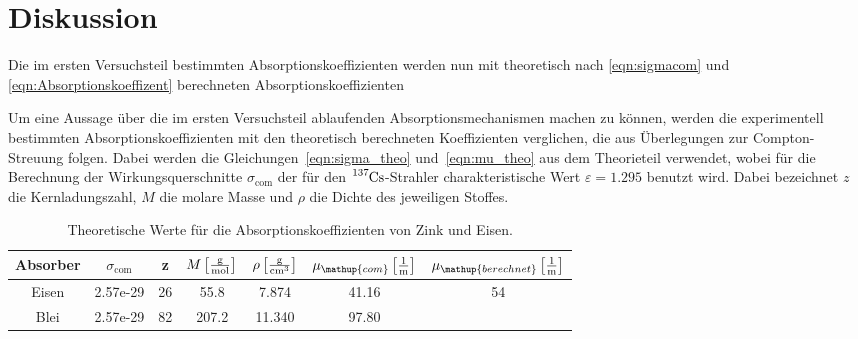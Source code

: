\section{Diskussion}
\label{sec:Diskussion}

Die im ersten Versuchsteil bestimmten Absorptionskoeffizienten werden nun mit theoretisch nach \autoref{eqn:sigmacom} und
\autoref{eqn:Absorptionskoeffizent} berechneten Absorptionskoeffizienten 


Um eine Aussage über die im ersten Versuchsteil ablaufenden Absorptionsmechanismen
machen zu können, werden die experimentell bestimmten Absorptionskoeffizienten
mit den theoretisch berechneten Koeffizienten verglichen, die aus Überlegungen
zur Compton-Streuung folgen. Dabei werden die Gleichungen~\eqref{eqn:sigma_theo}
und~\eqref{eqn:mu_theo} aus dem Theorieteil verwendet, wobei für die Berechnung
der Wirkungsquerschnitte $\sigma_{\mathup{com}}$ der für den
$\ce{^{137}Cs}$-Strahler charakteristische Wert $\varepsilon = \num{1.295}$
benutzt wird. Dabei bezeichnet $z$ die
Kernladungszahl, $M$ die molare Masse und $\rho$ die Dichte des jeweiligen
Stoffes.


\begin{table}[ht]
    \centering
    \caption{Theoretische Werte für die Absorptionskoeffizienten von Zink und Eisen.}
    \label{tab:theoriewerte}
	\begin{tabular}{S S S S S S S}
			\toprule
			{Absorber} & {$\sigma_{\mathup{com}}$} & {z} & {$M\left[\si{\frac{\gram}{\mol}}\right]$} &
            {$\rho\left[\si{\frac{\gram}{\centi\metre\cubed}}\right]$} &
            {$\mu_{\mathup{com}}\left[\si{\frac{1}{\metre}}\right]$} &
            {$\mu_{\mathup{berechnet}}\left[\si{\frac{1}{\metre}}\right]$} \\
			\midrule
			Eisen & 2.57e-29 & 26 &  55.8 &  7.874 & 41.16  & 54\\
            Blei  & 2.57e-29 & 82 & 207.2 & 11.340 & 97.80 &  \\
			\bottomrule
		\end{tabular}
\end{table}
